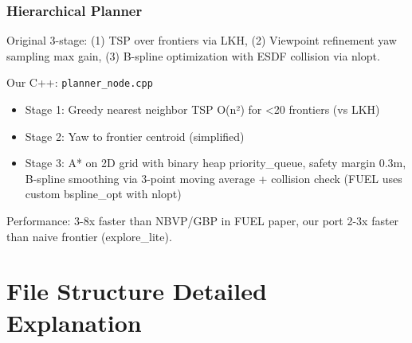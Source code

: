 \documentclass[12pt,a4paper]{article}
\begin{document}
\subsubsection{Hierarchical Planner}
Original 3-stage: (1) TSP over frontiers via LKH, (2) Viewpoint refinement yaw sampling max gain, (3) B-spline optimization with ESDF collision via nlopt.

Our C++: \texttt{planner\_node.cpp}
\begin{itemize}
    \item Stage 1: Greedy nearest neighbor TSP O(n²) for <20 frontiers (vs LKH)
    \item Stage 2: Yaw to frontier centroid (simplified)
    \item Stage 3: A* on 2D grid with binary heap priority\_queue, safety margin 0.3m, B-spline smoothing via 3-point moving average + collision check (FUEL uses custom bspline\_opt with nlopt)
\end{itemize}

Performance: 3-8x faster than NBVP/GBP in FUEL paper, our port 2-3x faster than naive frontier (explore\_lite).

\section{File Structure Detailed Explanation}
\end{document}
